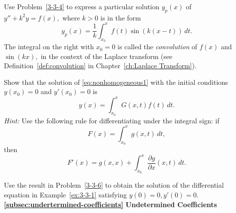 \begin{Exercise}
\Question\label{3-3-5}  Use Problem~\ref{3-3-4} to express a particular solution $y_p(x)$ of $y''+k^2 y = f(x),$ where $k>0$ is in the form
\[y_p(x) = \frac{1}{k}\int_{x_0}^x f(t) \sin(k(x-t))\, dt. \]
The integral on the right with $x_0=0$ is  called the \textit{convolution} of $f(x)$ and $\sin (kx),$ in the context of the Laplace transform (see Definition~\ref{def:convolution} in Chapter~\ref{ch:Laplace Transform}).

\Question\label{3-3-6} 
Show that the solution of \eqref{eq:nonhomogeneous1} with the initial conditions $y(x_0) = 0$ and $y'(x_0) = 0$ is 
		\[y(x) = \int_{x_0}^x G(x, t)  f(t) \, dt.\] \textit{Hint:} Use the following rule for  differentiating under the integral sign: 
		if \[F(x) = \int_{x_0}^x g(x, t)\, dt,\] then 
		\[F'(x) = g(x,x) + \int_{x_0}^x \frac{\partial g}{\partial x}(x, t) \, dt.\]

\Question\label{3-3-7}  Use the result in Problem~\ref{3-3-6} to obtain the solution of the differential equation in Example~\ref{ex:3-3-1} satisfying $y(0) = 0, y'(0) =0.$\\


\hspace{-3.5ex}\textbf{\ref{subsec:undertermined-coefficients}} \textbf{Undetermined Coefficients}\\


\end{Exercise}
